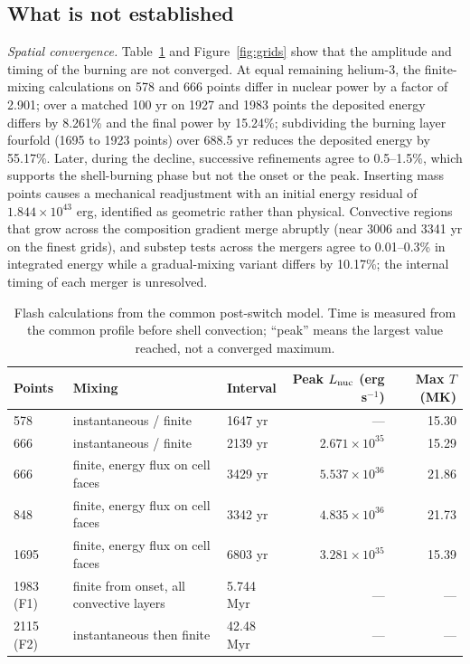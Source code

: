\subsection{What is not established}
\emph{Spatial convergence.} Table~\ref{tab:grids} and
Figure~\ref{fig:grids} show that the amplitude and timing of the burning are
not converged. At equal remaining helium-3, the finite-mixing calculations on
578 and 666 points differ in nuclear power by a factor of 2.901; over a
matched 100 yr on 1927 and 1983 points the deposited energy differs by
8.261\% and the final power by 15.24\%; subdividing the burning layer
fourfold (1695 to 1923 points) over 688.5 yr reduces the deposited energy by
55.17\%. Later, during the decline, successive refinements agree to
0.5--1.5\%, which supports the shell-burning phase but not the onset or the
peak. Inserting mass points causes a mechanical readjustment with an initial
energy residual of $1.844\times10^{43}$ erg, identified as geometric rather
than physical. Convective regions that grow across the composition gradient
merge abruptly (near 3006 and 3341 yr on the finest grids), and substep
tests across the mergers agree to 0.01--0.3\% in integrated energy while a
gradual-mixing variant differs by 10.17\%; the internal timing of each
merger is unresolved.

\begin{table}[H]\centering\small
\caption{Flash calculations from the common post-switch model. Time is
measured from the common profile before shell convection; ``peak'' means the
largest value reached, not a converged maximum.}\label{tab:grids}
\begin{tabular}{@{}lp{}lrr@{}}\toprule
Points & Mixing & Interval & Peak $L_{\rm nuc}$ (erg s$^{-1}$) & Max $T$ (MK) \\\midrule
578 & instantaneous / finite & 1647 yr & --- & 15.30 \\
666 & instantaneous / finite & 2139 yr & $2.671\times10^{35}$ & 15.29 \\
666 & finite, energy flux on cell faces & 3429 yr & $5.537\times10^{36}$ & 21.86 \\
848 & finite, energy flux on cell faces & 3342 yr & $4.835\times10^{36}$ & 21.73 \\
1695 & finite, energy flux on cell faces & 6803 yr & $3.281\times10^{35}$ & 15.39 \\
1983 (F1) & finite from onset, all convective layers & 5.744 Myr & --- & --- \\
2115 (F2) & instantaneous then finite & 42.48 Myr & --- & --- \\\bottomrule
\end{tabular}
\end{table}

